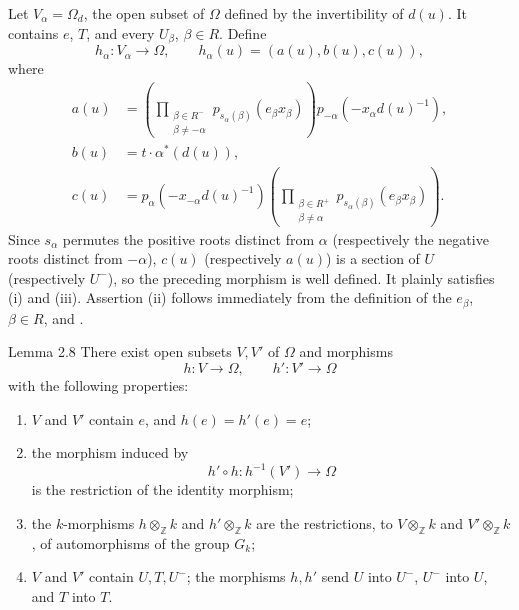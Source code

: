 Let \(V_\alpha=\Omega_d\), the open subset of \(\Omega\) defined by the
invertibility of \(d(u)\). It contains \(e\), \(T\), and every \(U_\beta\),
\(\beta\in R\). Define
\[
 h_\alpha\colon V_\alpha\longrightarrow\Omega,\qquad
 h_\alpha(u)=(a(u),b(u),c(u)),
\]
where
\begin{align*}
a(u)
 &=
\left(\prod_{\substack{\beta\in R^-\\\beta\ne-\alpha}}
 p_{s_\alpha(\beta)}(e_\beta x_\beta)\right)
p_{-\alpha}\!\left(-x_\alpha d(u)^{-1}\right),\\
b(u)&=t\cdot\alpha^\ast(d(u)),\\
c(u)
 &=p_\alpha\!\left(-x_{-\alpha}d(u)^{-1}\right)
\left(\prod_{\substack{\beta\in R^+\\\beta\ne\alpha}}
 p_{s_\alpha(\beta)}(e_\beta x_\beta)\right).
\end{align*}
Since \(s_\alpha\) permutes the positive roots distinct from \(\alpha\)
(respectively the negative roots distinct from \(-\alpha\)), \(c(u)\)
(respectively \(a(u)\)) is a section of \(U\) (respectively \(U^-\)),
so the preceding morphism is well defined. It plainly satisfies (i)
and (iii). Assertion (ii) follows immediately from the definition of
the \(e_\beta\), \(\beta\in R\), and .

\begin{sgastatement}{Lemma 2.8}
There exist open subsets \(V,V'\) of \(\Omega\) and morphisms
\[
 h\colon V\longrightarrow\Omega,\qquad
 h'\colon V'\longrightarrow\Omega
\]
with the following properties:
\begin{enumerate}[label=\textup{(\roman*)},leftmargin=2.2em]
\item \(V\) and \(V'\) contain \(e\), and \(h(e)=h'(e)=e\);
\item{} the morphism induced by
\[
 h'\circ h\colon h^{-1}(V')\longrightarrow\Omega
\]
is the restriction of the identity morphism;
\item{} the \(k\)-morphisms \(h\otimes_{\mathbb Z}k\) and
\(h'\otimes_{\mathbb Z}k\) are the restrictions, to
\(V\otimes_{\mathbb Z}k\) and \(V'\otimes_{\mathbb Z}k\), of
automorphisms of the group \(G_k\);
\item{} \(V\) and \(V'\) contain \(U,T,U^-\); the morphisms \(h,h'\)
send \(U\) into \(U^-\), \(U^-\) into \(U\), and \(T\) into \(T\).
\end{enumerate}
\end{sgastatement}

